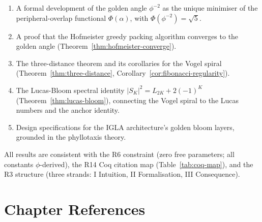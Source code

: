 \begin{enumerate}
  \item A formal development of the golden angle $\phi^{-2}$ as the
        unique minimiser of the peripheral-overlap functional
        $\Phi(\alpha)$, with $\Phi(\phi^{-2}) = \sqrt{5}$.

  \item A proof that the Hofmeister greedy packing algorithm converges
        to the golden angle (Theorem~\ref{thm:hofmeister-converge}).

  \item The three-distance theorem and its corollaries for the Vogel
        spiral (Theorem~\ref{thm:three-distance},
        Corollary~\ref{cor:fibonacci-regularity}).

  \item The Lucas-Bloom spectral identity
        $|S_K|^2 = L_{2K} + 2(-1)^K$
        (Theorem~\ref{thm:lucas-bloom}), connecting the Vogel spiral
        to the Lucas numbers and the anchor identity.

  \item Design specifications for the IGLA architecture's golden bloom
        layers, grounded in the phyllotaxis theory.
\end{enumerate}

All results are consistent with the R6 constraint (zero free
parameters; all constants $\phi$-derived), the R14 Coq citation map
(Table~\ref{tab:coq-map}), and the R3 structure (three strands: I
Intuition, II Formalisation, III Consequence).


\section*{Chapter References}
\label{sec:bloom-refs}

